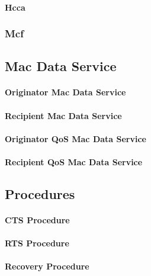 %
\paragraph{Hcca}
%

%
\subsubsection{Mcf}
%

\subsection{Mac Data Service}
\label{subsec:ieee-802.11-mac-data-service}
%

%
\paragraph{Originator Mac Data Service}
%

%
\paragraph{Recipient Mac Data Service}
%

%
\paragraph{Originator QoS Mac Data Service}
%

%
\paragraph{Recipient QoS Mac Data Service}
%

\subsection{Procedures}
\label{subsec:ieee-802.11-procedures}
%

%
\paragraph{CTS Procedure}
%

%
\paragraph{RTS Procedure}
%

%
\paragraph{Recovery Procedure}
%

